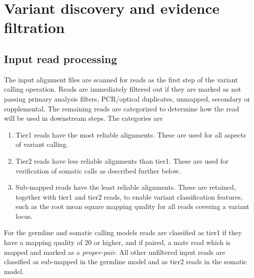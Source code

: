 \documentclass{article}
\begin{document}
\section{Variant discovery and evidence filtration}

\subsection{Input read processing}

The input alignment files are scanned for reads as the first step of the variant calling operation. Reads are immediately filtered out if they are marked as not passing primary analysis filters, PCR/optical duplicates, unmapped, secondary or supplemental. The remaining reads are categorized to determine how the read will be used in downstream steps. The categories are
\begin{enumerate}
    \item Tier1 reads have the most reliable alignments. These are used for all aspects of variant calling.
    \item Tier2 reads have less reliable alignments than tier1. These are used for verification of somatic calls as described further below.
    \item Sub-mapped reads have the least reliable alignments. These are retained, together with tier1 and tier2 reads, to enable  variant classification features, such as the root mean square mapping quality for all reads covering a variant locus.
\end{enumerate}

For the germline and somatic calling models reads are classified as tier1 if they have a mapping quality of 20 or higher, and if paired, a mate read which is mapped and marked as a \emph{proper-pair}. All other unfiltered input reads are classified as sub-mapped in the germline model and as tier2 reads in the somatic model.
\end{document}
